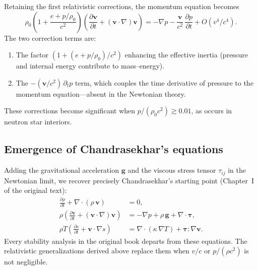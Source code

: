 Retaining the first relativistic corrections, the momentum equation
becomes
\begin{equation}
  \rho_0\!\left(1 + \frac{e + p/\rho_0}{c^2}\right)
    \!\left(\frac{\partial\mathbf{v}}{\partial t}
    + (\mathbf{v}\cdot\nabla)\mathbf{v}\right)
  = -\nabla p
    - \frac{\mathbf{v}}{c^2}\,\frac{\partial p}{\partial t}
    + O(v^4/c^4).
  \label{eq:post-newtonian-momentum}
\end{equation}
The two correction terms are:
\begin{enumerate}
\item The factor $(1 + (e + p/\rho_0)/c^2)$ enhancing the
  effective inertia (pressure and internal energy contribute to
  mass--energy).
\item The $-(\mathbf{v}/c^2)\,\partial_t p$ term, which couples the
  time derivative of pressure to the momentum equation---absent in
  the Newtonian theory.
\end{enumerate}
These corrections become significant when $p/(\rho_0 c^2) \gtrsim 0.01$,
as occurs in neutron star interiors.

\subsection{Emergence of Chandrasekhar's equations}
\label{sec:chandrasekhar-limit}

Adding the gravitational acceleration $\mathbf{g}$ and the viscous
stress tensor $\tau_{ij}$ in the Newtonian limit, we recover
precisely Chandrasekhar's starting point (Chapter~I of the original
text):
\begin{align}
  \frac{\partial\rho}{\partial t}
    + \nabla\cdot(\rho\,\mathbf{v}) &= 0,
  \label{eq:chandra-cont}\\[4pt]
  \rho\!\left(\frac{\partial\mathbf{v}}{\partial t}
    + (\mathbf{v}\cdot\nabla)\mathbf{v}\right)
  &= -\nabla p + \rho\,\mathbf{g}
    + \nabla\cdot\boldsymbol{\tau},
  \label{eq:chandra-mom}\\[4pt]
  \rho T\!\left(\frac{\partial s}{\partial t}
    + \mathbf{v}\cdot\nabla s\right)
  &= \nabla\cdot(\kappa\,\nabla T)
    + \boldsymbol{\tau}:\nabla\mathbf{v}.
  \label{eq:chandra-entropy}
\end{align}
Every stability analysis in the original book departs from these
equations.  The relativistic generalizations derived above replace
them when $v/c$ or $p/(\rho c^2)$ is not negligible.


